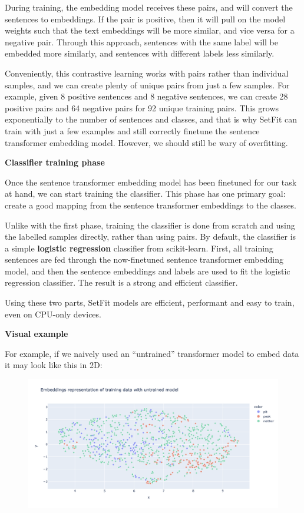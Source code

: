 \documentclass[
  letterpaper,
  DIV=11,
  numbers=noendperiod]{scrreprt}
\begin{document}
\begin{tcolorbox}
During training, the embedding model receives these pairs, and will
convert the sentences to embeddings. If the pair is positive, then it
will pull on the model weights such that the text embeddings will be
more similar, and vice versa for a negative pair. Through this approach,
sentences with the same label will be embedded more similarly, and
sentences with different labels less similarly.

Conveniently, this contrastive learning works with pairs rather than
individual samples, and we can create plenty of unique pairs from just a
few samples. For example, given 8 positive sentences and 8 negative
sentences, we can create 28 positive pairs and 64 negative pairs for 92
unique training pairs. This grows exponentially to the number of
sentences and classes, and that is why SetFit can train with just a few
examples and still correctly finetune the sentence transformer embedding
model. However, we should still be wary of overfitting.

\textbf{Classifier training phase}

Once the sentence transformer embedding model has been finetuned for our
task at hand, we can start training the classifier. This phase has one
primary goal: create a good mapping from the sentence transformer
embeddings to the classes.

Unlike with the first phase, training the classifier is done from
scratch and using the labelled samples directly, rather than using
pairs. By default, the classifier is a simple \textbf{logistic
regression} classifier from scikit-learn. First, all training sentences
are fed through the now-finetuned sentence transformer embedding model,
and then the sentence embeddings and labels are used to fit the logistic
regression classifier. The result is a strong and efficient classifier.

Using these two parts, SetFit models are efficient, performant and easy
to train, even on CPU-only devices.

\textbf{Visual example}

For example, if we naively used an ``untrained'' transformer model to
embed data it may look like this in 2D:

\begin{figure}[H]

{\centering \includegraphics{quarto_docs/../img/setfit_untrained.png}

}
\end{figure}
\end{tcolorbox}
\end{document}
